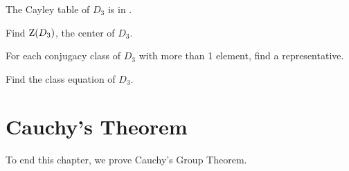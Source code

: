 \newpage

\begin{exercise}
    The Cayley table of $D_3$ is in .
    \begin{partquestions}{\alph*}
        \item Find $\mathrm{Z}(D_3)$, the center of $D_3$.
        \item For each conjugacy class of $D_3$ with more than 1 element, find a representative.
        \item Find the class equation of $D_3$.
    \end{partquestions}
\end{exercise}

\section{Cauchy's Theorem}
To end this chapter, we prove Cauchy's Group Theorem.

